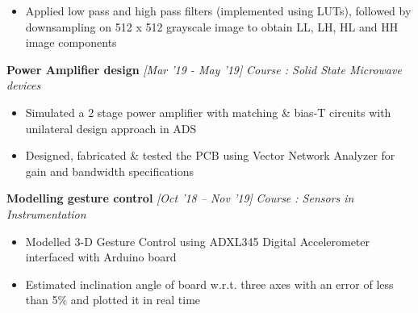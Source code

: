 \documentclass[10 pt]{article}%
\begin{document}
{{{\begin{itemize}[leftmargin=*]
	\item Applied low pass and high pass filters (implemented using LUTs), followed by downsampling on 512 x 512 grayscale image to obtain LL, LH, HL and HH image components
	\end{itemize}
{\flushleft \textbf {\large{Power Amplifier design}} \hfill {{{\em{[Mar '19 - May '19]}}}}
	\vspace{-0.8em}
	{\flushleft \em{Course : Solid State Microwave devices}}
	\vspace{-5pt}
	\begin{itemize}[leftmargin=*]
		\setlength\itemsep{1.5pt}
		\setlength\parskip{1.5pt}
		\item Simulated a 2 stage power amplifier with matching \& bias-T circuits with unilateral design approach in ADS 
		\item Designed, fabricated \& tested the PCB using Vector Network Analyzer for gain and bandwidth specifications
	\end{itemize}
{\flushleft \textbf {\large{Modelling gesture control}} \hfill {{{\em{[Oct '18 – Nov '19]}}}}
	\vspace{-0.8em}
	{\flushleft \em{Course : Sensors in Instrumentation}}
	\vspace{-5pt}
	\begin{itemize}[leftmargin=*]
		\setlength\itemsep{1.5pt}
\setlength\parskip{1.5pt}
		\item Modelled 3-D Gesture Control using ADXL345 Digital Accelerometer interfaced with Arduino board
		\item Estimated inclination angle of board w.r.t. three axes with an error of less than 5\% and plotted it in real time
	\end{itemize}
}}}}}
\end{document}
